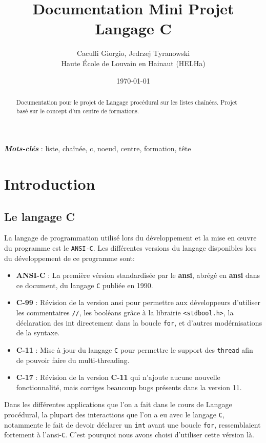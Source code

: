 \documentclass[11pt]{article}
\title{Documentation Mini Projet Langage C}
\author{Caculli Giorgio, Jedrzej Tyranowski\\Haute École de Louvain en Hainaut (HELHa)}
\date{\today}
\begin{document}
\maketitle
\begin{abstract}
  Documentation pour le projet de Langage procédural sur les listes chaînées. Projet basé sur le concept
  d'un centre de formations.
\end{abstract}
\textbf{\textit{Mots-clés}} : liste, chaînée, c, noeud, centre, formation, tête

\newpage
\tableofcontents

\newpage
\section{Introduction}

\subsection{Le langage C}
La langage de programmation utilisé lors du développement et la mise en \oe{}uvre du programme est le
\texttt{ANSI-C}. Les différentes versions du langage disponibles lors du développement de ce programme sont:
\begin{itemize}
\item \textbf{ANSI-C} : La première vérsion standardisée par le \textbf{\acrlong{ansi}},
  abrégé en \textbf{\acrshort{ansi}} dans ce document, du langage \texttt{C} publiée en 1990.
\item \textbf{C-99} : Révision de la version \acrshort{ansi} pour permettre aux développeurs d'utiliser les
  commentaires \texttt{//}, les booléans grâce à la librairie \texttt{<stdbool.h>}, la déclaration des int
  directement dans la boucle \texttt{for}, et d'autres modérnisations de la syntaxe.
\item \textbf{C-11} : Mise à jour du langage \texttt{C} pour permettre le support des \texttt{thread} afin de pouvoir faire du multi-threading.
\item \textbf{C-17} : Révision de la version \textbf{C-11} qui n'ajoute aucune nouvelle fonctionnalité, mais
  corriges beaucoup bugs présents dans la version 11.
\end{itemize}
Dans les différentes applications que l'on a fait dans le cours de Langage procédural, la plupart des
interactions que l'on a eu avec le langage \texttt{C}, notammente le fait de devoir déclarer un \texttt{int}
avant une boucle \texttt{for}, ressemblaient fortement à l'\acrshort{ansi}-\texttt{C}. C'est pourquoi nous
avons choisi d'utiliser cette vérsion là.
\end{document}
